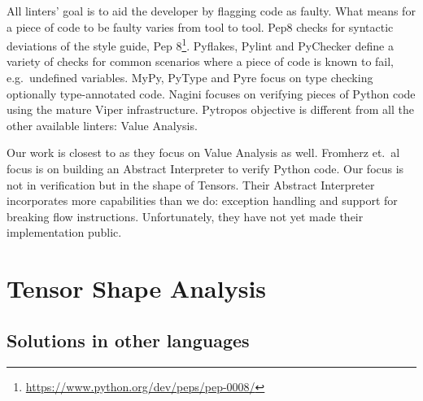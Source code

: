 All linters' goal is to aid the developer by flagging code as faulty. What means for a
piece of code to be faulty varies from tool to tool. Pep8 checks for syntactic deviations
of the style guide, Pep 8\footnote{\url{https://www.python.org/dev/peps/pep-0008/}}.
Pyflakes, Pylint and PyChecker define a variety of checks for common scenarios where a
piece of code is known to fail, e.g.~undefined variables. MyPy, PyType and Pyre focus on
type checking optionally type-annotated code. Nagini focuses on verifying pieces of Python
code using the mature Viper \autocite{muller_viper_2016} infrastructure. Pytropos
objective is different from all the other available linters: Value Analysis.

Our work is closest to \textcite{fromherz_static_2018} as they focus on Value Analysis as
well. Fromherz et.~al focus is on building an Abstract Interpreter to verify Python code.
Our focus is not in verification but in the shape of Tensors. Their Abstract Interpreter
incorporates more capabilities than we do: exception handling and support for breaking
flow instructions. Unfortunately, they have not yet made their implementation public.

\section{Tensor Shape Analysis}

%

\subsection{Solutions in other languages}

